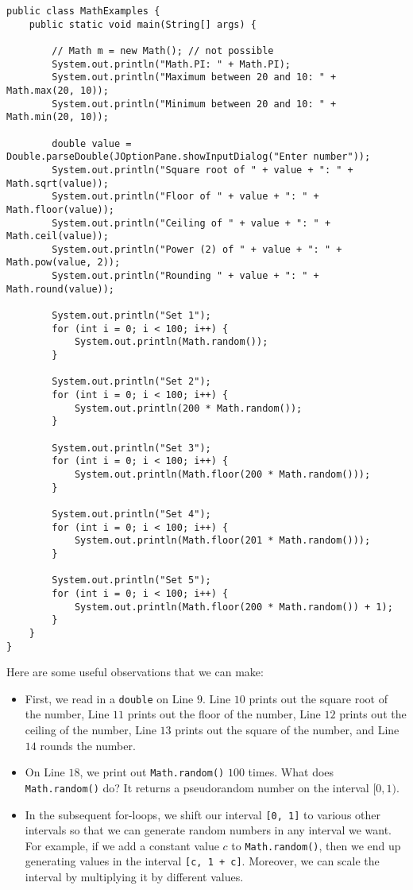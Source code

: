 \begin{lstlisting}
public class MathExamples {
	public static void main(String[] args) {

		// Math m = new Math(); // not possible
		System.out.println("Math.PI: " + Math.PI);
		System.out.println("Maximum between 20 and 10: " + Math.max(20, 10));
		System.out.println("Minimum between 20 and 10: " + Math.min(20, 10));

		double value = Double.parseDouble(JOptionPane.showInputDialog("Enter number"));
		System.out.println("Square root of " + value + ": " + Math.sqrt(value));
		System.out.println("Floor of " + value + ": " + Math.floor(value));
		System.out.println("Ceiling of " + value + ": " + Math.ceil(value));
		System.out.println("Power (2) of " + value + ": " + Math.pow(value, 2));
		System.out.println("Rounding " + value + ": " + Math.round(value));

		System.out.println("Set 1");
		for (int i = 0; i < 100; i++) {
			System.out.println(Math.random());
		}

		System.out.println("Set 2");
		for (int i = 0; i < 100; i++) {
			System.out.println(200 * Math.random());
		}

		System.out.println("Set 3");
		for (int i = 0; i < 100; i++) {
			System.out.println(Math.floor(200 * Math.random()));
		}

		System.out.println("Set 4");
		for (int i = 0; i < 100; i++) {
			System.out.println(Math.floor(201 * Math.random()));
		}

		System.out.println("Set 5");
		for (int i = 0; i < 100; i++) {
			System.out.println(Math.floor(200 * Math.random()) + 1);
		}
	}
}
\end{lstlisting}

Here are some useful observations that we can make:

\begin{itemize}
    \item First, we read in a \verb!double! on Line $9$. Line $10$ prints out the square root of the number, Line $11$ prints out the floor of the number, Line $12$ prints out the ceiling of the number, Line $13$ prints out the square of the number, and Line $14$ rounds the number.
		\item On Line $18$, we print out \verb!Math.random()! $100$ times. What does \verb!Math.random()! do? It returns a pseudorandom number on the interval $[0, 1)$. 
    \item In the subsequent for-loops, we shift our interval \verb![0, 1]! to various other intervals so that we can generate random numbers in any interval we want. For example, if we add a constant value $c$ to \verb!Math.random()!, then we end up generating values in the interval \verb![c, 1 + c]!. Moreover, we can scale the interval by multiplying it by different values.
\end{itemize}

